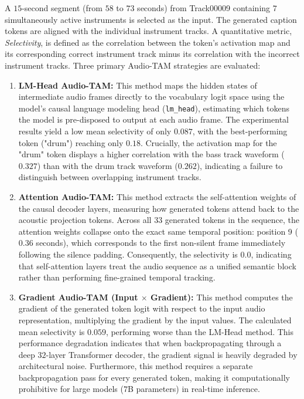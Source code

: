 \documentclass[12pt, conference, letterpaper]{IEEEtran}
\begin{document}
A $15$-second segment (from $58$ to $73$ seconds) from Track00009 containing $7$ simultaneously active instruments is selected as the input. The generated caption tokens are aligned with the individual instrument tracks. A quantitative metric, \textit{Selectivity}, is defined as the correlation between the token's activation map and its corresponding correct instrument track minus its correlation with the incorrect instrument tracks. Three primary Audio-TAM strategies are evaluated:
\begin{enumerate}
    \item \textbf{LM-Head Audio-TAM:} This method maps the hidden states of intermediate audio frames directly to the vocabulary logit space using the model's causal language modeling head (\texttt{lm\_head}), estimating which tokens the model is pre-disposed to output at each audio frame. The experimental results yield a low mean selectivity of only $0.087$, with the best-performing token ("drum") reaching only $0.18$. Crucially, the activation map for the "drum" token displays a higher correlation with the bass track waveform ($0.327$) than with the drum track waveform ($0.262$), indicating a failure to distinguish between overlapping instrument tracks.
    \item \textbf{Attention Audio-TAM:} This method extracts the self-attention weights of the causal decoder layers, measuring how generated tokens attend back to the acoustic projection tokens. Across all $33$ generated tokens in the sequence, the attention weights collapse onto the exact same temporal position: position 9 ($0.36$ seconds), which corresponds to the first non-silent frame immediately following the silence padding. Consequently, the selectivity is $0.0$, indicating that self-attention layers treat the audio sequence as a unified semantic block rather than performing fine-grained temporal tracking.
    \item \textbf{Gradient Audio-TAM (Input $\times$ Gradient):} This method computes the gradient of the generated token logit with respect to the input audio representation, multiplying the gradient by the input values. The calculated mean selectivity is $0.059$, performing worse than the LM-Head method. This performance degradation indicates that when backpropagating through a deep $32$-layer Transformer decoder, the gradient signal is heavily degraded by architectural noise. Furthermore, this method requires a separate backpropagation pass for every generated token, making it computationally prohibitive for large models ($7$B parameters) in real-time inference.
\end{enumerate}
\end{document}
